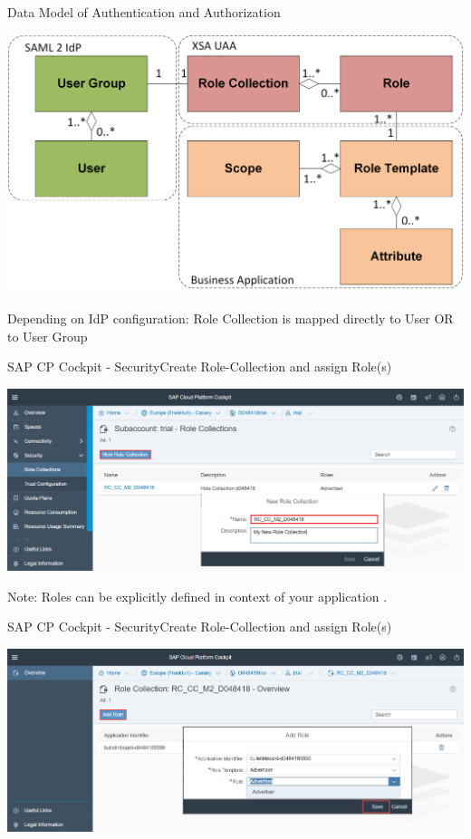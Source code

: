\begin{frame}{Data Model of Authentication and Authorization}
\centerline{\includegraphics[width=\textwidth]{../Security/images/ERRolesAndScopes}}
\vfill
\scriptsize
Depending on IdP configuration: Role Collection is mapped directly to User OR to User Group
\end{frame}


\begin{frame}[t]{SAP CP Cockpit - Security}{Create Role-Collection and assign Role(s)}
\centerline{\includegraphics[width=\textwidth]{../Security/images/CockpitRoleCollectionCreate}}
\scriptsize
\vfill
Note: Roles can be explicitly defined in context of your application .
\end{frame}

\begin{frame}[t]{SAP CP Cockpit - Security}{Create Role-Collection and assign Role(s)}
\centerline{\includegraphics[width=\textwidth]{../Security/images/CockpitRoleCollectionAddRole}}
\end{frame}

